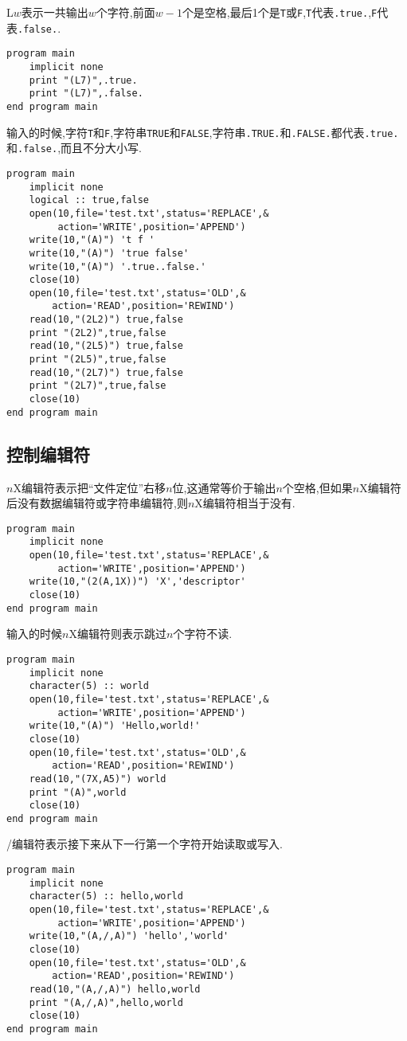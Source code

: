 L$w$表示一共输出$w$个字符,前面$w-1$个是空格,最后1个是\texttt{T}或\texttt{F},\texttt{T}代表\texttt{.true.},\texttt{F}代表\texttt{.false.}.
\begin{lstlisting}
program main
    implicit none
    print "(L7)",.true.
    print "(L7)",.false.
end program main
\end{lstlisting}
输入的时候,字符\texttt{T}和\texttt{F},字符串\texttt{TRUE}和\texttt{FALSE},字符串\texttt{.TRUE.}和\texttt{.FALSE.}都代表\texttt{.true.}和\texttt{.false.},而且不分大小写.
\begin{lstlisting}
program main
    implicit none
    logical :: true,false
    open(10,file='test.txt',status='REPLACE',&
         action='WRITE',position='APPEND')
    write(10,"(A)") 't f '
    write(10,"(A)") 'true false'
    write(10,"(A)") '.true..false.'
    close(10)
    open(10,file='test.txt',status='OLD',&
        action='READ',position='REWIND')
    read(10,"(2L2)") true,false
    print "(2L2)",true,false
    read(10,"(2L5)") true,false
    print "(2L5)",true,false
    read(10,"(2L7)") true,false
    print "(2L7)",true,false
    close(10)
end program main
\end{lstlisting}

\subsection{控制编辑符}

$n$X编辑符表示把``文件定位''右移$n$位,这通常等价于输出$n$个空格,但如果$n$X编辑符后没有数据编辑符或字符串编辑符,则$n$X编辑符相当于没有.
\begin{lstlisting}
program main
    implicit none
    open(10,file='test.txt',status='REPLACE',&
         action='WRITE',position='APPEND')
    write(10,"(2(A,1X))") 'X','descriptor'
    close(10)
end program main
\end{lstlisting}
输入的时候$n$X编辑符则表示跳过$n$个字符不读.
\begin{lstlisting}
program main
    implicit none
    character(5) :: world
    open(10,file='test.txt',status='REPLACE',&
         action='WRITE',position='APPEND')
    write(10,"(A)") 'Hello,world!'
    close(10)
    open(10,file='test.txt',status='OLD',&
        action='READ',position='REWIND')
    read(10,"(7X,A5)") world
    print "(A)",world
    close(10)
end program main
\end{lstlisting}

/编辑符表示接下来从下一行第一个字符开始读取或写入.
\begin{lstlisting}
program main
    implicit none
    character(5) :: hello,world
    open(10,file='test.txt',status='REPLACE',&
         action='WRITE',position='APPEND')
    write(10,"(A,/,A)") 'hello','world'
    close(10)
    open(10,file='test.txt',status='OLD',&
        action='READ',position='REWIND')
    read(10,"(A,/,A)") hello,world
    print "(A,/,A)",hello,world
    close(10)
end program main
\end{lstlisting}

